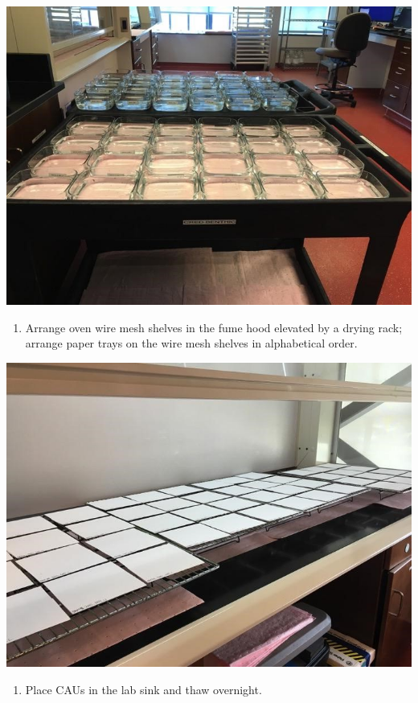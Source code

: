 \documentclass[]{book}
\providecommand{\tightlist}{%
  \setlength{\itemsep}{0pt}\setlength{\parskip}{0pt}}
\begin{document}
\includegraphics{images/DailyTasks3.jpg}

\begin{enumerate}
\def\labelenumi{\arabic{enumi}.}
\setcounter{enumi}{3}
\tightlist
\item
  Arrange oven wire mesh shelves in the fume hood elevated by a drying rack; arrange paper trays on the wire mesh shelves in alphabetical order.
\end{enumerate}

\includegraphics{images/DailyTasks4.jpg}

\begin{enumerate}
\def\labelenumi{\arabic{enumi}.}
\setcounter{enumi}{4}
\tightlist
\item
  Place CAUs in the lab sink and thaw overnight.
\end{enumerate}
\end{document}
